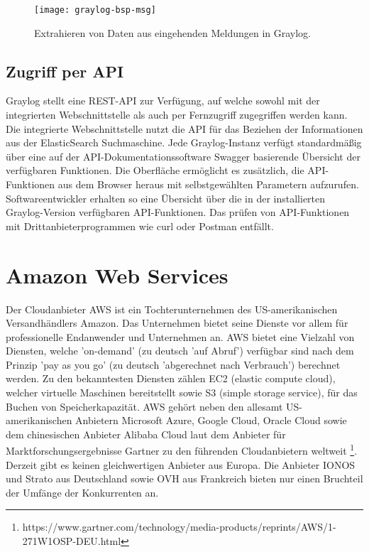 \begin{figure}[h!]
\centering
\texttt{[image: graylog-bsp-msg]}
\caption{Extrahieren von Daten aus eingehenden Meldungen in Graylog.}
\end{figure}

\newpage

\subsection{Zugriff per API}

Graylog stellt eine REST-API zur Verfügung, auf welche sowohl mit der integrierten Webschnittstelle als auch per Fernzugriff zugegriffen werden kann. Die integrierte Webschnittstelle nutzt die API für das Beziehen der Informationen aus der ElasticSearch Suchmaschine. Jede Graylog-Instanz verfügt standardmäßig über eine auf der API-Dokumentationssoftware Swagger basierende Übersicht der verfügbaren Funktionen. Die Oberfläche ermöglicht es zusätzlich, die API-Funktionen aus dem Browser heraus mit selbstgewählten Parametern aufzurufen. Softwareentwickler erhalten so eine Übersicht über die in der installierten Graylog-Version verfügbaren API-Funktionen. Das prüfen von API-Funktionen mit Drittanbieterprogrammen wie curl oder Postman entfällt.

\section{Amazon Web Services}

Der Cloudanbieter AWS ist ein Tochterunternehmen des US-amerikanischen Versandhändlers Amazon. Das Unternehmen bietet seine Dienste vor allem für professionelle Endanwender und Unternehmen an. AWS bietet eine Vielzahl von Diensten, welche 'on-demand' (zu deutsch 'auf Abruf') verfügbar sind nach dem Prinzip 'pay as you go' (zu deutsch 'abgerechnet nach Verbrauch') berechnet werden. Zu den bekanntesten Diensten zählen EC2 (elastic compute cloud), welcher virtuelle Maschinen bereitstellt sowie S3 (simple storage service), für das Buchen von Speicherkapazität. AWS gehört neben den allesamt US-amerikanischen Anbietern Microsoft Azure, Google Cloud, Oracle Cloud sowie dem chinesischen Anbieter Alibaba Cloud laut dem Anbieter für Marktforschungsergebnisse Gartner zu den führenden Cloudanbietern weltweit \footnote{https://www.gartner.com/technology/media-products/reprints/AWS/1-271W1OSP-DEU.html}. Derzeit gibt es keinen gleichwertigen Anbieter aus Europa. Die Anbieter IONOS und Strato aus Deutschland sowie OVH aus Frankreich bieten nur einen Bruchteil der Umfänge der Konkurrenten an.

